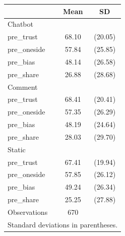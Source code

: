 \begin{tabular}{l*{1}{cc}}
\toprule
                    &        Mean&          SD\\
\midrule
Chatbot             &            &            \\
pre\_trust           &       68.10&     (20.05)\\
pre\_oneside         &       57.84&     (25.85)\\
pre\_bias            &       48.14&     (26.58)\\
pre\_share           &       26.88&     (28.68)\\
\midrule
Comment             &            &            \\
pre\_trust           &       68.41&     (20.41)\\
pre\_oneside         &       57.35&     (26.29)\\
pre\_bias            &       48.19&     (24.64)\\
pre\_share           &       28.03&     (29.70)\\
\midrule
Static              &            &            \\
pre\_trust           &       67.41&     (19.94)\\
pre\_oneside         &       57.85&     (26.12)\\
pre\_bias            &       49.24&     (26.34)\\
pre\_share           &       25.25&     (27.88)\\
\midrule
Observations        &         670&            \\
\bottomrule
\multicolumn{3}{l}{\footnotesize Standard deviations in parentheses.}\\
\end{tabular}
